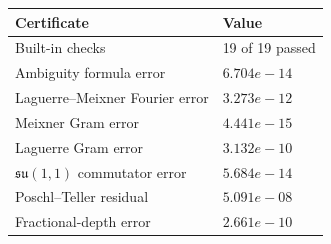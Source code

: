 
\begin{center}
\begin{tabular}{L{0.39\textwidth}L{0.47\textwidth}}
\toprule
Certificate & Value\\
\midrule
Built-in checks & 19 of 19 passed\\
Ambiguity formula error & $6.704e-14$\\
Laguerre--Meixner Fourier error & $3.273e-12$\\
Meixner Gram error & $4.441e-15$\\
Laguerre Gram error & $3.132e-10$\\
$\mathfrak{su}(1,1)$ commutator error & $5.684e-14$\\
Poschl--Teller residual & $5.091e-08$\\
Fractional-depth error & $2.661e-10$\\
\bottomrule
\end{tabular}
\end{center}
